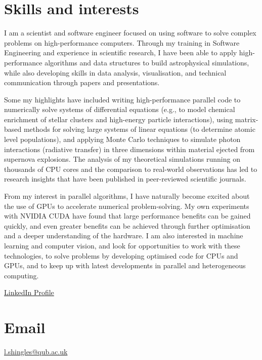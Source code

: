 \documentclass[11pt]{res} %
\begin{document}

\begin{resume}

\section{Skills and interests}
  I am a scientist and software engineer focused on using software to solve complex problems on high-performance computers. Through my training in Software Engineering and experience in scientific research, I have been able to apply high-performance algorithms and data structures to build astrophysical simulations, while also developing skills in data analysis, visualisation, and technical communication through papers and presentations.

  Some my highlights have included writing high-performance parallel code to numerically solve systems of differential equations (e.g., to model chemical enrichment of stellar clusters and high-energy particle interactions), using matrix-based methods for solving large systems of linear equations (to determine atomic level populations), and applying Monte Carlo techniques to simulate photon interactions (radiative transfer) in three dimensions within material ejected from supernova explosions. The analysis of my theoretical simulations running on thousands of CPU cores and the comparison to real-world observations has led to research insights that have been published in peer-reviewed scientific journals.

  From my interest in parallel algorithms, I have naturally become excited about the use of GPUs to accelerate numerical problem-solving. My own experiments with NVIDIA CUDA have found that large performance benefits can be gained quickly, and even greater benefits can be achieved through further optimisation and a deeper understanding of the hardware. I am also interested in machine learning and computer vision, and look for opportunities to work with these technologies, to solve problems by developing optimised code for CPUs and GPUs, and to keep up with latest developments in parallel and heterogeneous computing.

  \href{https://www.linkedin.com/in/lukeshingles/}{LinkedIn Profile}

\section{Email}
  \href{mailto:l.shingles@qub.ac.uk}{l.shingles@qub.ac.uk}


\end{resume}
\end{document}
